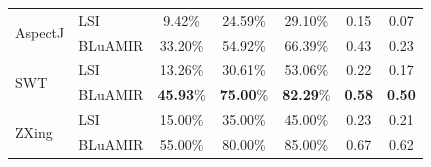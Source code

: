 \documentclass[sigconf,review,anonymous]{acmart}
\begin{document}
\begin{table}[!tb]
{\begin{tabular}{l|l|c|c|c|c|c}
			\multirow{2}{*}{AspectJ}       &LSI     &  9.42\%& 24.59\%&29.10\%& 0.15 & 0.07  \\ \cline{2-7}
			& BLuAMIR                                                                                                                     & 33.20\%                                                 & 54.92\%                                                 & 66.39\%                                                  &   0.43  &  0.23    \\ 
			\hline
			\multirow{2}{*}{SWT}       &LSI     &  13.26\%& 30.61\%&53.06\%& 0.22 & 0.17  \\ \cline{2-7}
			& BLuAMIR                                                                                                                     & \textbf{45.93}\%                                                 & \textbf{75.00}\%                                                 & \textbf{82.29}\%                                                  &   \textbf{0.58}  &  \textbf{0.50}    \\ 
			\hline
			\multirow{2}{*}{ZXing}       &LSI     &  15.00\%& 35.00\%&45.00\%& 0.23 & 0.21  \\ \cline{2-7}
			& BLuAMIR                                                                                                                     & 55.00\%                                                 & 80.00\%                                                 & 85.00\%                                                  &   0.67  &  0.62    \\ 
			\hline
	\end{tabular}}
	\vspace{-.2cm}
	\centering
\end{table}
\end{document}
